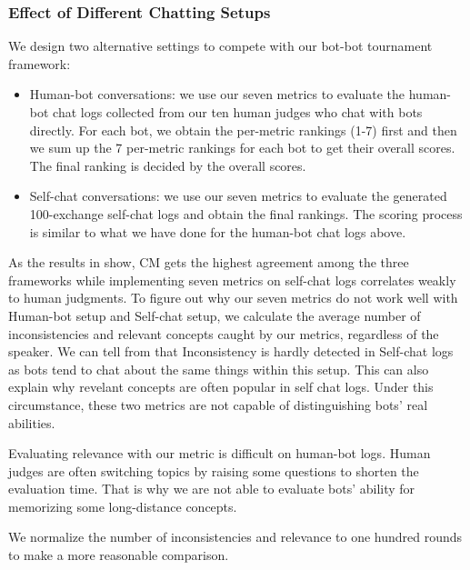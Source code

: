 \subsubsection{Effect of Different Chatting Setups}
We design two alternative settings to compete with our bot-bot tournament 
framework:
\begin{itemize}
\item Human-bot conversations: we use our seven metrics to evaluate
the human-bot chat logs
collected 
from our ten human judges who
chat with bots directly. 
For each bot, we obtain the per-metric rankings (1-7) 
first and then we sum up the 7 per-metric rankings
for each bot
 to get their overall scores.
The final ranking is decided by the overall scores.
\item Self-chat conversations: 
we use our seven metrics to evaluate
the generated
 100-exchange self-chat logs 
and obtain the final rankings. 
The scoring process is similar 
to what we have done for the human-bot chat logs above.
\end{itemize} 

As the results in  show, CM gets the highest agreement
 among the three frameworks while
implementing seven metrics 
on self-chat logs 
correlates weakly
to human judgments.
To figure out why our seven metrics do not 
work well with Human-bot setup and Self-chat setup, 
we calculate the average number of inconsistencies and relevant concepts
caught by our metrics, regardless of the speaker.
 We can tell from  that
Inconsistency is hardly
detected in Self-chat logs
as bots tend to chat about the same things
within this setup.
This can also explain why revelant 
concepts are often popular in self chat logs.
Under this 
circumstance, 
these two metrics are not 
capable of distinguishing bots' real
abilities.
 
Evaluating relevance with our metric
is difficult on human-bot logs. Human judges
are often switching topics by raising 
some questions to shorten the evaluation time.
That is why we are not able to evaluate bots'
ability for memorizing some long-distance concepts.
 
We normalize the number of inconsistencies and relevance to one hundred rounds
to make a more reasonable comparison.
    
